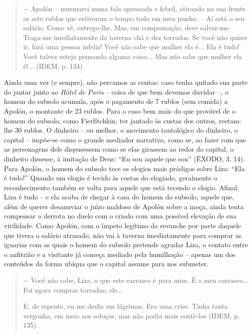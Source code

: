 \begin{quote}
− Apolón -- murmurei numa fala apressada e febril, atirando na sua
frente os sete rublos que estiveram o tempo todo em meu punho. -- Aí
está o seu salário. Como vê, entrego-lhe. Mas, em compensação, deve
salvar-me. Traga-me imediatamente da taverna chá e dez torradas. Se você
não quiser ir, fará uma pessoa infeliz! Você não sabe que mulher ela
é... Ela é tudo! Você talvez esteja pensando alguma coisa... Mas não
sabe que mulher ela é!... (IDEM, p. 134)
\end{quote}

Ainda uma vez (e sempre), não percamos as contas: caso tenha quitado sua
parte do jantar junto ao \emph{Hôtel de Paris} -- coisa de que bem
devemos duvidar --, o homem do subsolo acumula, após o pagamento de 7
rublos (sem comida) a Apolón, o montante de 23 rublos. Para o caso bem
mais do que provável de o homem do subsolo, como Fierfítchkin, ter
jantado às custas dos outros, restam-lhe 30 rublos. O dinheiro -- ou
melhor, o movimento tautológico do dinheiro, o capital -- impõe-se como
o grande mediador narrativo, como se, ao fazer com que as personagens
dele dispusessem como se elas girassem ao redor do capital, o dinheiro
dissesse, à imitação de Deus: ``Eu sou aquele que sou'' (ÊXODO, 3, 14).
Para Apolón, o homem do subsolo tece os elogios mais pródigos sobre
Liza: ``Ela é tudo!'' Quando um elogio é tecido às costas do elogiado,
geralmente o reconhecimento também se volta para aquele que está tecendo
o elogio. Afinal, Liza é tudo -- e ela acaba de chegar à casa do homem
do subsolo, aquele que, além de querer desanuviar o juízo maldoso de
Apolón sobre a moça, ainda tenta compensar a derrota no duelo com o
criado com uma possível elevação de sua virilidade. Como Apolón, com o
ímpeto legítimo da revanche por parte daquele que tivera o salário
atrasado, não vai à taverna imediatamente para comprar as iguarias com
as quais o homem do subsolo pretende agradar Liza, o contato entre o
anfitrião e a visitante já começa mediado pela humilhação -- apenas um
dos conteúdos da forma ubíqua que o capital assume para nos submeter.

\begin{quote}
− Você não sabe, Liza, o que este carrasco é para mim. É o meu
carrasco... Foi agora comprar torradas; ele...

E, de repente, eu me desfiz em lágrimas. Era uma crise. Tinha tanta
vergonha, em meio aos soluços, mas não podia mais contê-los (IDEM, p.
135).
\end{quote}

